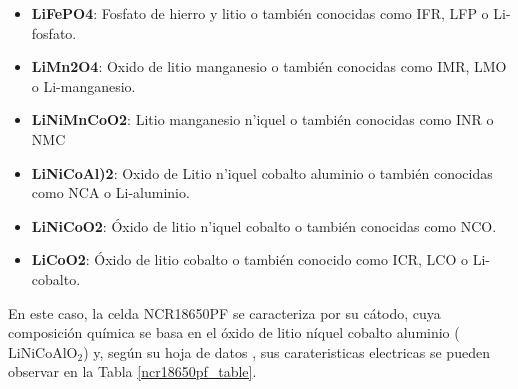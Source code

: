 \documentclass[10pt,a4paper]{article}
\begin{document}
\begin{itemize}
    \item \textbf{LiFePO4}: Fosfato de hierro y litio o tambi\'en conocidas como
        IFR, LFP o Li-fosfato.
    \item \textbf{LiMn2O4}: Oxido de litio manganesio o tambi\'en conocidas como
        IMR, LMO o Li-manganesio.
    \item \textbf{LiNiMnCoO2}: Litio manganesio n'iquel o tambi\'en conocidas como
        INR o NMC
    \item \textbf{LiNiCoAl)2}: Oxido de Litio n'iquel cobalto aluminio o
        tambi\'en conocidas como NCA o Li-aluminio.
    \item \textbf{LiNiCoO2}: \'Oxido de litio n'iquel cobalto o tambi\'en
        conocidas como NCO.
    \item \textbf{LiCoO2}: \'Oxido de litio cobalto o tambi\'en conocido como
        ICR, LCO o Li-cobalto.
\end{itemize}

En este caso, la celda NCR18650PF se caracteriza por su cátodo, cuya composición 
química se basa en el óxido de litio níquel cobalto aluminio 
($\mathrm{LiNiCoAlO_2}$) y, según su hoja de datos \cite{18650pf}, sus 
carateristicas electricas se pueden observar en la Tabla \ref{ncr18650pf_table}.
\end{document}
